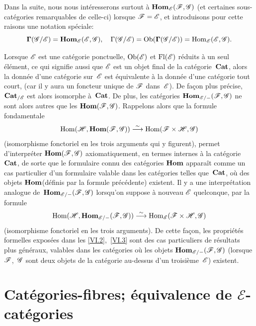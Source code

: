 Dans la suite, nous nous int\'eresserons surtout \`a
$\SheafHom_{\cal{E}}(\cal{F},\cal{G})$ (et certaines
sous-cat\'egories remarquables de celle-ci) lorsque
$\cal{F}=\cal{E}$, et introduisons pour cette raisons une notation
sp\'eciale:
$$
\bf{\Gamma}(\cal{G}/\cal{E})=
\SheafHom_{\cal{E}}(\cal{E},\cal{G})\quoi,\quad
\Gamma(\cal{G}/\cal{E})=\Ob(\bf{\Gamma}(\cal{G}/\cal{E}))=
\Hom_{\cal{E}}(\cal{E},\cal{G})\quoi.
$$
\label{indnot:fm}
\begin{remarquesstar}
Lorsque
$\cal{E}$ est une cat\'egorie ponctuelle,
\ie $\Ob(\cal{E})$ et $\Fl(\cal{E})$ r\'eduits \`a un seul
\'el\'ement, ce qui signifie aussi que $\cal{E}$ est un objet
final de la cat\'egorie~$\mathbf{Cat}$, alors la donn\'ee d'une
cat\'egorie sur~$\cal{E}$ est \'equivalente \`a la donn\'ee
d'une cat\'egorie tout court, (car il y aura un foncteur unique de
$\cal{F}$ dans~$\cal{E}$). De fa\c con plus pr\'ecise,
$\Cat_{/\cal{E}}$ est alors isomorphe \`a~$\mathbf{Cat}$. De plus, les
cat\'egories $\SheafHom_{\cal{E}/-}(\cal{F},\cal{G})$ ne sont alors
autres que les $\SheafHom(\cal{F},\cal{G})$. Rappelons alors que la
formule fondamentale
$$
\Hom(\cal{H},\SheafHom(\cal{F},\cal{G}))\isomto
\Hom(\cal{F}\times\cal{H},\cal{G})
$$
(isomorphisme fonctoriel en les trois arguments qui y figurent),
permet d'interpr\'eter $\SheafHom(\cal{F},\cal{G})$ axiomatiquement,
en termes internes \`a la cat\'egorie~$\mathbf{Cat}$, de sorte que le
formulaire connu des cat\'egories $\operatorname{\mathbf{Hom}}$ appara\^it comme un
cas particulier d'un formulaire valable dans les cat\'egories telles
que~$\mathbf{Cat}$, o\`u des \og objets $\operatorname{\mathbf{Hom}}$\fg (d\'efinis par la
formule pr\'ec\'edente) existent. Il y a une interpr\'etation
analogue de~$\SheafHom_{\cal{E}/-}(\cal{F},\cal{G})$ lorsqu'on suppose
\`a nouveau $\cal{E}$ quelconque, par la formule
$$
\Hom(\cal{H},\SheafHom_{\cal{E}/-}(\cal{F},\cal{G}))\isomto
\Hom_{\cal{E}}(\cal{F}\times\cal{H},\cal{G})
$$
(isomorphisme fonctoriel en les trois arguments). De cette fa\c con,
les propri\'et\'es formelles expos\'ees dans les \No \ref{VI.2},~\ref{VI.3} sont
des cas particuliers de r\'esultats plus g\'en\'eraux, valables
dans les cat\'egories o\`u les objets
$\SheafHom_{\cal{E}/-}(\cal{F},\cal{G})$ (lorsque $\cal{F}$,~$\cal{G}$
sont deux objets de la cat\'egorie au-dessus d'un troisi\`eme~$\cal{E}$) existent.
\end{remarquesstar}

\section[Cat\'egories-fibres]{Cat\'egories-fibres; \'equivalence de
$\mathcal{E}$-cat\'egories}
\label{VI.4}

